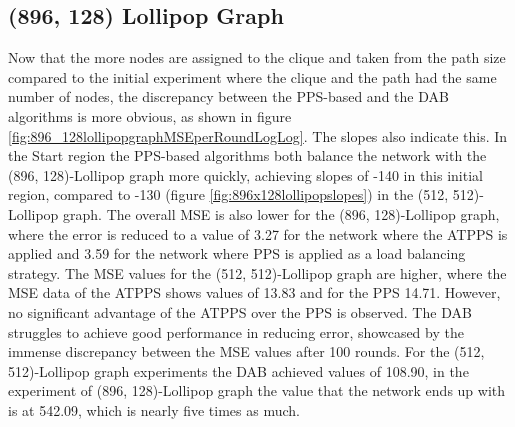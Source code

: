 \subsection{(896, 128) Lollipop Graph}\label{subsec:896_128lollipop}
Now that the more nodes are assigned to the clique and taken from the path size compared to the initial experiment where the clique and the path had the same number of nodes, the discrepancy between the PPS-based and the DAB algorithms is more obvious, as shown in figure \ref{fig:896_128lollipopgraphMSEperRoundLogLog}. The slopes also indicate this. In the Start region the PPS-based algorithms both balance the network with the (896, 128)-Lollipop graph more quickly, achieving slopes of -140 in this initial region, compared to -130 (figure \ref{fig:896x128lollipopslopes}) in the (512, 512)-Lollipop graph. The overall MSE is also lower for the (896, 128)-Lollipop graph, where the error is reduced to a value of 3.27 for the network where the ATPPS is applied and 3.59 for the network where PPS is applied as a load balancing strategy. The MSE values for the (512, 512)-Lollipop graph are higher, where the MSE data of the ATPPS shows values of 13.83 and for the PPS 14.71. However, no significant advantage of the ATPPS over the PPS is observed. The DAB struggles to achieve good performance in reducing error, showcased by the immense discrepancy between the MSE values after 100 rounds. For the (512, 512)-Lollipop graph experiments the DAB achieved values of 108.90, in the experiment of (896, 128)-Lollipop graph the value that the network ends up with is at 542.09, which is nearly five times as much.

